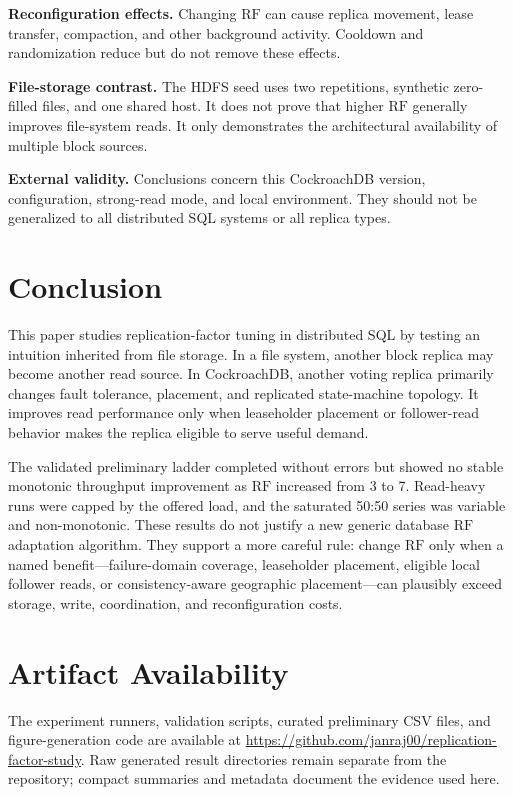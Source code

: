 \documentclass[a4paper,10pt,twocolumn]{article}
\newcommand{\rf}{\ensuremath{\mathrm{RF}}}
\newcommand{\cockroach}{CockroachDB}
\newcommand{\hdfs}{HDFS}
\begin{document}
\textbf{Reconfiguration effects.} Changing \rf{} can cause replica movement,
lease transfer, compaction, and other background activity. Cooldown and
randomization reduce but do not remove these effects.

\textbf{File-storage contrast.} The \hdfs{} seed uses two repetitions,
synthetic zero-filled files, and one shared host. It does not prove that higher
\rf{} generally improves file-system reads. It only demonstrates the
architectural availability of multiple block sources.

\textbf{External validity.} Conclusions concern this \cockroach{} version,
configuration, strong-read mode, and local environment. They should not be
generalized to all distributed SQL systems or all replica types.

\section{Conclusion}
\label{sec:conclusion}

This paper studies replication-factor tuning in distributed SQL by testing an
intuition inherited from file storage. In a file system, another block replica
may become another read source. In \cockroach{}, another voting replica
primarily changes fault tolerance, placement, and replicated state-machine
topology. It improves read performance only when leaseholder placement or
follower-read behavior makes the replica eligible to serve useful demand.

The validated preliminary ladder completed without errors but showed no stable
monotonic throughput improvement as \rf{} increased from 3 to 7. Read-heavy
runs were capped by the offered load, and the saturated 50:50 series was
variable and non-monotonic. These results do not justify a new generic
database \rf{} adaptation algorithm. They support a more careful rule: change
\rf{} only when a named benefit---failure-domain coverage, leaseholder
placement, eligible local follower reads, or consistency-aware geographic
placement---can plausibly exceed storage, write, coordination, and
reconfiguration costs.

\section*{Artifact Availability}

The experiment runners, validation scripts, curated preliminary CSV files, and
figure-generation code are available at
\url{https://github.com/janraj00/replication-factor-study}. Raw generated
result directories remain separate from the repository; compact summaries and
metadata document the evidence used here.

\setlength{\bibsep}{2pt}
\balance


\end{document}
